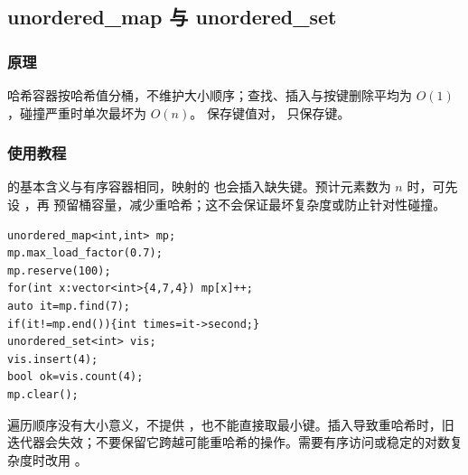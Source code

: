 \subsection{unordered\_map 与 unordered\_set}
\label{stl:unordered}
\subsubsection*{原理}
哈希容器按哈希值分桶，不维护大小顺序；查找、插入与按键删除平均为 $O(1)$，碰撞严重时单次最坏为 $O(n)$。 保存键值对， 只保存键。
\subsubsection*{使用教程}
 的基本含义与有序容器相同，映射的  也会插入缺失键。预计元素数为 $n$ 时，可先设 ，再  预留桶容量，减少重哈希；这不会保证最坏复杂度或防止针对性碰撞。
\begin{lstlisting}[style=mtycpp,numbers=none]
unordered_map<int,int> mp;
mp.max_load_factor(0.7);
mp.reserve(100);
for(int x:vector<int>{4,7,4}) mp[x]++;
auto it=mp.find(7);
if(it!=mp.end()){int times=it->second;}
unordered_set<int> vis;
vis.insert(4);
bool ok=vis.count(4);
mp.clear();
\end{lstlisting}
遍历顺序没有大小意义，不提供 ，也不能直接取最小键。插入导致重哈希时，旧迭代器会失效；不要保留它跨越可能重哈希的操作。需要有序访问或稳定的对数复杂度时改用 。
